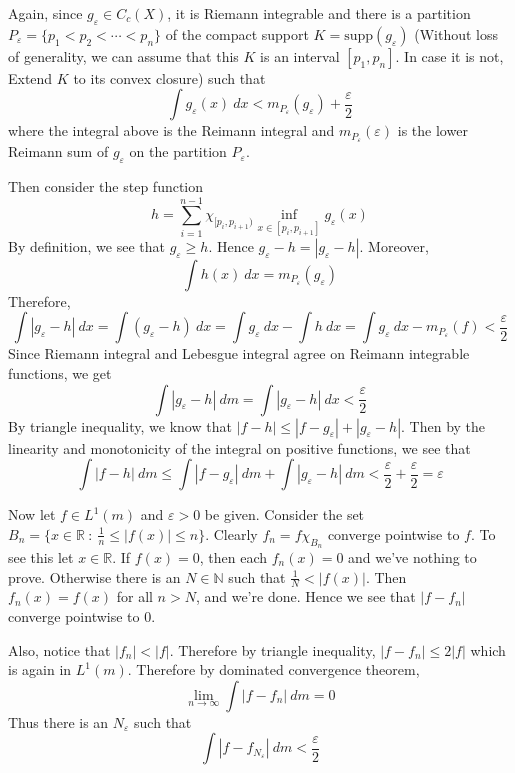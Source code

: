 \documentclass[12pt]{exam}
\theoremstyle{plain} %
\theoremstyle{definition} %
\theoremstyle{remark} %
\begin{document}
\begin{questions}
\begin{solution}
    Again, since $g_\varepsilon \in C_c(X)$, it is Riemann integrable
    and there is a partition $P_\varepsilon = \{p_1 < p_2 < \cdots <
    p_n \}$ of the compact support $K = \textrm{supp}(g_\varepsilon)$
    (Without loss of generality, we can assume that this $K$ is an
      interval $[p_1, p_n]$. In case it is not, Extend $K$ to its
    convex closure)
    such that \[
      \int g_\varepsilon(x) \ d  x < m_{P_\varepsilon}(g_\varepsilon) +
      \frac{\varepsilon}{2}
    \]
    where the integral above is the Reimann integral and
    $m_{P_\varepsilon}(\varepsilon)$ is the lower Reimann sum of $g_\varepsilon$
    on the partition $P_\varepsilon$.

    Then consider the step function \[
      h = \sum_{i = 1}^{n-1} \chi_{[p_{i}, p_{i+1})} \inf_{x \in
      [p_{i}, p_{i+1}]}g_\varepsilon(x)
    \]
    By definition, we see that $g_\varepsilon \ge h$. Hence
    $g_\varepsilon - h = |g_\varepsilon - h|$. Moreover, \[
      \int h(x) \ d x = m_{P_\varepsilon}(g_\varepsilon)
    \]
    Therefore, \[
      \int |g_\varepsilon - h| \ d x = \int (g_\varepsilon - h)\ d x =
      \int g_\varepsilon \ dx - \int h \ d x = \int g_\varepsilon \ d
      x - m_{P_\varepsilon}(f) < \frac{\varepsilon}{2}
    \]
    Since Riemann integral and Lebesgue integral agree on Reimann
    integrable functions, we get \[
      \int |g_\varepsilon - h| \ d m = \int |g_\varepsilon - h| \ d x
      < \frac{\varepsilon}{2}
    \]
    By triangle inequality, we know that $|f - h| \le |f -
    g_\varepsilon| + |g_\varepsilon - h|$. Then by the linearity and
    monotonicity of the integral on positive functions, we see that \[
      \int |f - h| \ d m \le \int |f - g_\varepsilon| \ d m + \int
      |g_\varepsilon - h| \ d m < \frac{\varepsilon}{2} +
      \frac{\varepsilon}{2} =  \varepsilon
    \]

    Now let $f \in L^1(m)$ and $\varepsilon > 0$ be
    given. Consider the set $B_n = \{ x \in
    \mathbb{R}  \ : \  \frac{1}{n} \le |f(x)| \le n \}$. Clearly $f_n
    = f \chi_{B_n}$ converge pointwise to $f$. To see this let $x \in
    \mathbb{R}$. If $f(x) = 0$, then each $f_n(x) = 0$ and we've
    nothing to prove. Otherwise there is an $N \in \mathbb{N}$ such
    that $\frac{1}{N} < |f(x)|$. Then $f_n(x) = f(x)$ for all $n >
    N$, and we're done. Hence we see that $|f - f_n|$ converge pointwise to $0$.

    Also, notice that $|f_n| < |f|$. Therefore by triangle
    inequality, $|f - f_n| \le 2|f|$ which is again in $L^1(m)$.
    Therefore by dominated convergence theorem, \[
      \lim_{n \to \infty} \int |f - f_n| \ d m = 0
    \]
    Thus there is an $N_\varepsilon$ such that \[
      \int |f - f_{N_\varepsilon}| \ d m < \frac{\varepsilon}{2}
    \]


\end{solution}
\end{questions}
\end{document}
